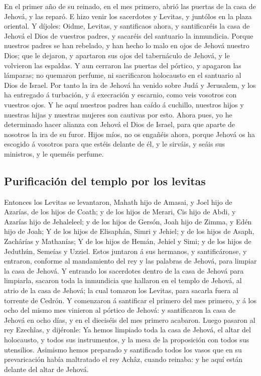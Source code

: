  En el primer año de su reinado, en el mes primero, abrió
las puertas de la casa de Jehová, y las reparó.  E hizo
venir los sacerdotes y Levitas, y juntólos en la plaza oriental.
 Y díjoles: Oidme, Levitas, y santificaos ahora, y
santificaréis la casa de Jehová el Dios de vuestros padres, y sacaréis
del santuario la inmundicia.  Porque nuestros padres se han
rebelado, y han hecho lo malo en ojos de Jehová nuestro Dios; que le
dejaron, y apartaron sus ojos del tabernáculo de Jehová, y le volvieron
las espaldas.  Y aun cerraron las puertas del pórtico, y
apagaron las lámparas; no quemaron perfume, ni sacrificaron holocausto
en el santuario al Dios de Israel.  Por tanto la ira de
Jehová ha venido sobre Judá y Jerusalem, y los ha entregado á turbación,
y á execración y escarnio, como veis vosotros con vuestros ojos.
 Y he aquí nuestros padres han caído á cuchillo, nuestros
hijos y nuestras hijas y nuestras mujeres son cautivas por esto.
 Ahora pues, yo he determinado hacer alianza con Jehová el
Dios de Israel, para que aparte de nosotros la ira de su furor.
 Hijos míos, no os engañéis ahora, porque Jehová os ha
escogido á vosotros para que estéis delante de él, y le sirváis, y seáis
sus ministros, y le queméis perfume.

\hypertarget{purificaciuxf3n-del-templo-por-los-levitas}{%
\subsection{Purificación del templo por los
levitas}\label{purificaciuxf3n-del-templo-por-los-levitas}}

 Entonces los Levitas se levantaron, Mahath hijo de Amasai,
y Joel hijo de Azarías, de los hijos de Coath; y de los hijos de Merari,
Cis hijo de Abdi, y Azarías hijo de Jehaleleel; y de los hijos de
Gersón, Joah hijo de Zimma, y Edén hijo de Joah;  Y de los
hijos de Elisaphán, Simri y Jehiel; y de los hijos de Asaph, Zachârías y
Mathanías;  Y de los hijos de Hemán, Jehiel y Simi; y de
los hijos de Jeduthún, Semeías y Uzziel.  Estos juntaron á
sus hermanos, y santificáronse, y entraron, conforme al mandamiento del
rey y las palabras de Jehová, para limpiar la casa de Jehová.
 Y entrando los sacerdotes dentro de la casa de Jehová para
limpiarla, sacaron toda la inmundicia que hallaron en el templo de
Jehová, al atrio de la casa de Jehová; la cual tomaron los Levitas, para
sacarla fuera al torrente de Cedrón.  Y comenzaron á
santificar el primero del mes primero, y á los ocho del mismo mes
vinieron al pórtico de Jehová: y santificaron la casa de Jehová en ocho
días, y en el dieciséis del mes primero acabaron.  Luego
pasaron al rey Ezechîas, y dijéronle: Ya hemos limpiado toda la casa de
Jehová, el altar del holocausto, y todos sus instrumentos, y la mesa de
la proposición con todos sus utensilios.  Asimismo hemos
preparado y santificado todos los vasos que en su prevaricación había
maltratado el rey Achâz, cuando reinaba: y he aquí están delante del
altar de Jehová.

